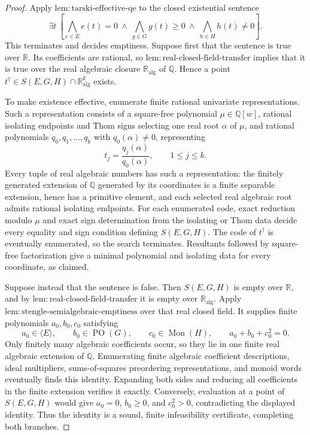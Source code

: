 \documentclass{article}
\begin{document}
\begin{proof}
Apply \(\mathrm{lem{:}tarski\text{-}effective\text{-}qe}\) to the closed existential sentence
\[
 \exists t\ \left[
   \bigwedge_{e\in E}e(t)=0
   \ \wedge\ 
   \bigwedge_{g\in G}g(t)\geq0
   \ \wedge\ 
   \bigwedge_{h\in H}h(t)\neq0
 \right].
\]
This terminates and decides emptiness.  Suppose first that the sentence is true over \(\mathbb R\).  Its coefficients are rational, so \(\mathrm{lem{:}real\text{-}closed\text{-}field\text{-}transfer}\) implies that it is true over the real algebraic closure \(\mathbb R_{\mathrm{alg}}\) of \(\mathbb Q\).  Hence a point \(t^\dagger\in S(E,G,H)\cap\mathbb R_{\mathrm{alg}}^k\) exists.

To make existence effective, enumerate finite rational univariate representations.  Such a representation consists of a square-free polynomial \(\mu\in\mathbb Q[w]\), rational isolating endpoints and Thom signs selecting one real root \(\alpha\) of \(\mu\), and rational polynomials \(q_0,q_1,\ldots,q_k\) with \(q_0(\alpha)\neq0\), representing
\[
 t_j=\frac{q_j(\alpha)}{q_0(\alpha)},
 \qquad 1\leq j\leq k.
\]
Every tuple of real algebraic numbers has such a representation: the finitely generated extension of \(\mathbb Q\) generated by its coordinates is a finite separable extension, hence has a primitive element, and each selected real algebraic root admits rational isolating endpoints.  For each enumerated code, exact reduction modulo \(\mu\) and exact sign determination from the isolating or Thom data decide every equality and sign condition defining \(S(E,G,H)\).  The code of \(t^\dagger\) is eventually enumerated, so the search terminates.  Resultants followed by square-free factorization give a minimal polynomial and isolating data for every coordinate, as claimed.

Suppose instead that the sentence is false.  Then \(S(E,G,H)\) is empty over \(\mathbb R\), and by \(\mathrm{lem{:}real\text{-}closed\text{-}field\text{-}transfer}\) it is empty over \(\mathbb R_{\mathrm{alg}}\).  Apply \(\mathrm{lem{:}stengle\text{-}semialgebraic\text{-}emptiness}\) over that real closed field.  It supplies finite polynomials \(a_0,b_0,c_0\) satisfying
\[
 a_0\in\langle E\rangle,
 \qquad b_0\in\operatorname{PO}(G),
 \qquad c_0\in\operatorname{Mon}(H),
 \qquad a_0+b_0+c_0^2=0.
\]
Only finitely many algebraic coefficients occur, so they lie in one finite real algebraic extension of \(\mathbb Q\).  Enumerating finite algebraic coefficient descriptions, ideal multipliers, sums-of-squares preordering representations, and monoid words eventually finds this identity.  Expanding both sides and reducing all coefficients in the finite extension verifies it exactly.  Conversely, evaluation at a point of \(S(E,G,H)\) would give \(a_0=0\), \(b_0\geq0\), and \(c_0^2>0\), contradicting the displayed identity.  Thus the identity is a sound, finite infeasibility certificate, completing both branches.
\end{proof}
\end{document}
